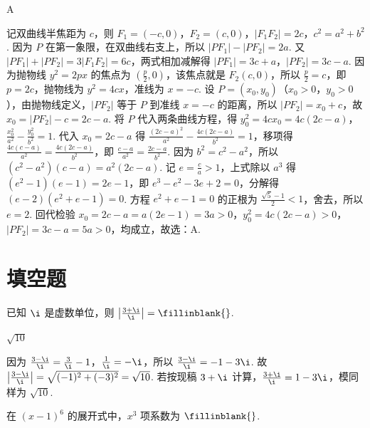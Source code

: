 \documentclass[UTF8,a4paper,oneside,11pt]{ctexbook}
\begin{document}
\begin{answer}
A
\end{answer}

\begin{solution}
记双曲线半焦距为 \(c\)，则 \(F_{1}=(-c,0)\)，\(F_{2}=(c,0)\)，\(|F_{1}F_{2}|=2c\)，\(c^{2}=a^{2}+b^{2}\). 因为 \(P\) 在第一象限，在双曲线右支上，所以 \(|PF_{1}|-|PF_{2}|=2a\). 又 \(|PF_{1}|+|PF_{2}|=3|F_{1}F_{2}|=6c\)，两式相加减解得 \(|PF_{1}|=3c+a\)，\(|PF_{2}|=3c-a\). 因为抛物线 \(y^{2}=2px\) 的焦点为 \(\left(\frac{p}{2},0\right)\)，该焦点就是 \(F_{2}(c,0)\)，所以 \(\frac{p}{2}=c\)，即 \(p=2c\)，抛物线为 \(y^{2}=4cx\)，准线为 \(x=-c\). 设 \(P=(x_{0},y_{0})\)（\(x_{0}>0\)，\(y_{0}>0\)），由抛物线定义，\(|PF_{2}|\) 等于 \(P\) 到准线 \(x=-c\) 的距离，所以 \(|PF_{2}|=x_{0}+c\)，故 \(x_{0}=|PF_{2}|-c=2c-a\). 将 \(P\) 代入两条曲线方程，得 \(y_{0}^{2}=4cx_{0}=4c(2c-a)\)，\(\frac{x_{0}^{2}}{a^{2}}-\frac{y_{0}^{2}}{b^{2}}=1\). 代入 \(x_{0}=2c-a\) 得 \(\frac{(2c-a)^{2}}{a^{2}}-\frac{4c(2c-a)}{b^{2}}=1\)，移项得 \(\frac{4c(c-a)}{a^{2}}=\frac{4c(2c-a)}{b^{2}}\)，即 \(\frac{c-a}{a^{2}}=\frac{2c-a}{b^{2}}\). 因为 \(b^{2}=c^{2}-a^{2}\)，所以 \((c^{2}-a^{2})(c-a)=a^{2}(2c-a)\). 记 \(e=\frac{c}{a}>1\)，上式除以 \(a^{3}\) 得 \((e^{2}-1)(e-1)=2e-1\)，即 \(e^{3}-e^{2}-3e+2=0\)，分解得 \((e-2)(e^{2}+e-1)=0\). 方程 \(e^{2}+e-1=0\) 的正根为 \(\frac{\sqrt{5}-1}{2}<1\)，舍去，所以 \(e=2\). 回代检验 \(x_{0}=2c-a=a(2e-1)=3a>0\)，\(y_{0}^{2}=4c(2c-a)>0\)，\(|PF_{2}|=3c-a=5a>0\)，均成立，故选：A.
\end{solution}
\section{填空题}

\begin{problem}
已知 \(\i\) 是虚数单位，则 \(\left|\frac{3+\i}{\i}\right|=\fillinblank{}\).
\end{problem}

\begin{answer}
\(\sqrt{10}\)
\end{answer}

\begin{solution}
因为 \(\frac{3-\i}{\i}=\frac{3}{\i}-1\)，\(\frac{1}{\i}=-\i\)，所以 \(\frac{3-\i}{\i}=-1-3\i\). 故 \(\left|\frac{3-\i}{\i}\right|=\sqrt{(-1)^{2}+(-3)^{2}}=\sqrt{10}\). 若按现稿 \(3+\i\) 计算，\(\frac{3+\i}{\i}=1-3\i\)，模同样为 \(\sqrt{10}\).
\end{solution}

\begin{problem}
在 \((x-1)^6\) 的展开式中，\(x^3\) 项系数为 \(\fillinblank{}\).
\end{problem}
\end{document}
